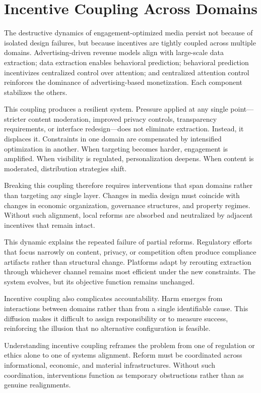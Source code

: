 \documentclass[12pt]{article}
\begin{document}
\section{Incentive Coupling Across Domains}

The destructive dynamics of engagement-optimized media persist not because of isolated design failures, but because incentives are tightly coupled across multiple domains. Advertising-driven revenue models align with large-scale data extraction; data extraction enables behavioral prediction; behavioral prediction incentivizes centralized control over attention; and centralized attention control reinforces the dominance of advertising-based monetization. Each component stabilizes the others.

This coupling produces a resilient system. Pressure applied at any single point—stricter content moderation, improved privacy controls, transparency requirements, or interface redesign—does not eliminate extraction. Instead, it displaces it. Constraints in one domain are compensated by intensified optimization in another. When targeting becomes harder, engagement is amplified. When visibility is regulated, personalization deepens. When content is moderated, distribution strategies shift.

Breaking this coupling therefore requires interventions that span domains rather than targeting any single layer. Changes in media design must coincide with changes in economic organization, governance structures, and property regimes. Without such alignment, local reforms are absorbed and neutralized by adjacent incentives that remain intact.

This dynamic explains the repeated failure of partial reforms. Regulatory efforts that focus narrowly on content, privacy, or competition often produce compliance artifacts rather than structural change. Platforms adapt by rerouting extraction through whichever channel remains most efficient under the new constraints. The system evolves, but its objective function remains unchanged.

Incentive coupling also complicates accountability. Harm emerges from interactions between domains rather than from a single identifiable cause. This diffusion makes it difficult to assign responsibility or to measure success, reinforcing the illusion that no alternative configuration is feasible.

Understanding incentive coupling reframes the problem from one of regulation or ethics alone to one of systems alignment. Reform must be coordinated across informational, economic, and material infrastructures. Without such coordination, interventions function as temporary obstructions rather than as genuine realignments.
\end{document}
